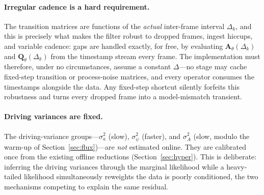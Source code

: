 \documentclass[11pt]{article}
\begin{document}
\paragraph{Irregular cadence is a hard requirement.} The transition matrices are functions of the
\emph{actual} inter-frame interval $\Delta_k$, and this is precisely what makes the filter robust to
dropped frames, ingest hiccups, and variable cadence: gaps are handled exactly, for free, by
evaluating $\bm{A}_\theta(\Delta_k)$ and $\bm{Q}_\theta(\Delta_k)$ from the timestamp stream every
frame. The implementation must therefore, under no circumstances, assume a constant $\Delta$---no
stage may cache fixed-step transition or process-noise matrices, and every operator consumes the
timestamps alongside the data. Any fixed-step shortcut silently forfeits this robustness and turns
every dropped frame into a model-mismatch transient.

\paragraph{Driving variances are fixed.} The driving-variance groups---$\sigma_a^2$ (slow),
$\sigma_\psi^2$ (faster), and $\sigma_A^2$ (slow, modulo the warm-up of
Section~\ref{sec:flux})---are \emph{not} estimated online. They are calibrated once from the
existing offline reductions (Section~\ref{sec:hyper}). This is deliberate: inferring the
driving variances through the marginal likelihood while a heavy-tailed likelihood
simultaneously reweights the data is poorly conditioned, the two mechanisms competing to
explain the same residual.
\end{document}
